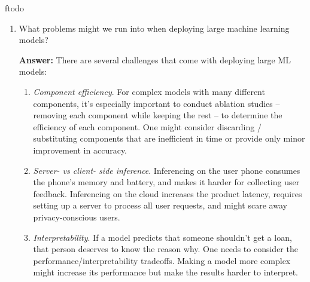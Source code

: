 ƒtodo\documentclass{article}
\newenvironment{QandA}{\begin{enumerate}[label=\arabic*.]}{\end{enumerate}}
\newenvironment{ListAlph}{\begin{enumerate}[label=(\alph*)]}{\end{enumerate}}
\newenvironment{answer}{\par\normalfont \textbf{Answer:}}{}
\newcommand{\g}{\vert}
\begin{document}
\begin{QandA}
\begin{answer}
\begin{ListAlph}
            \item Caused by the test data. Given a distribution $P(X, Y)$, where $X$ are the inputs, and $Y$ are the targets, a model deployed in production can experience the following shifts in data:
            \begin{itemize}
                \item Covariate shift: $P(X)$ changes, but $P(Y \g X)$ remains the same.
                \item Label shift: $P(Y)$ changes, but $P(X \g Y)$ remains the same.
                \item Concept drift: $P(Y \g X) $ changes, but $P(X)$ remains the same.
            \end{itemize}
        \end{ListAlph}
        (See more \href{https://huyenchip.com/2022/02/07/data-distribution-shifts-and-monitoring.html}{here})
    \end{answer}
    
    \item What problems might we run into when deploying large machine learning models?
    \begin{answer}
        There are several challenges that come with deploying large ML models:
        \begin{ListAlph}
            \item \textit{Component efficiency}. For complex models with many different components, it's especially important to conduct ablation studies -- removing each component while keeping the rest -- to determine the efficiency of each component. One might consider discarding / substituting components that are inefficient in time or provide only minor improvement in accuracy.

            \item \textit{Server- vs client- side inference}. Inferencing on the user phone consumes the phone's memory and battery, and makes it harder for collecting user feedback. Inferencing on the cloud increases the product latency, requires setting up a server to process all user requests, and might scare away privacy-conscious users.

            \item \textit{Interpretability}. If a model predicts that someone shouldn't get a loan, that person deserves to know the reason why. One needs to consider the performance/interpretability tradeoffs. Making a model more complex might increase its performance but make the results harder to interpret. 


\end{ListAlph}
\end{answer}
\end{QandA}
\end{document}
